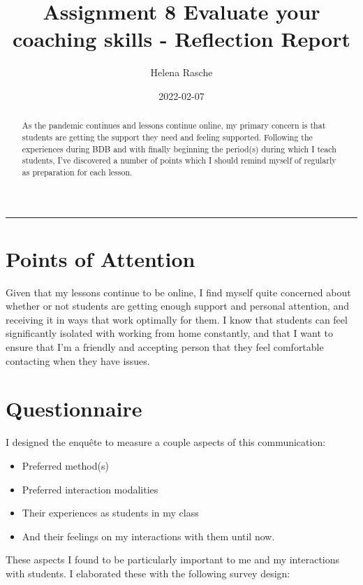 \documentclass[paper=a4,justified,a4paper]{tufte-handout}
\title{Assignment 8 Evaluate your coaching skills - Reflection Report}
\author{Helena Rasche}
\date{2022-02-07}
\providecommand{\tightlist}{%
  \setlength{\itemsep}{0pt}\setlength{\parskip}{0pt}}
\begin{document}
\maketitle
\begin{abstract}
As the pandemic continues and lessons continue online, my primary
concern is that students are getting the support they need and feeling
supported. Following the experiences during BDB and with finally
beginning the period(s) during which I teach students, I've discovered a
number of points which I should remind myself of regularly as
preparation for each lesson.
\end{abstract}
\noindent\rule{5in}{0.4pt}


\hypertarget{points-of-attention}{%
\section{Points of Attention}\label{points-of-attention}}

Given that my lessons continue to be online, I find myself quite
concerned about whether or not students are getting enough support and
personal attention, and receiving it in ways that work optimally for
them. I know that students can feel significantly isolated with working
from home constantly, and that I want to ensure that I'm a friendly and
accepting person that they feel comfortable contacting when they have
issues.

\hypertarget{questionnaire}{%
\section{Questionnaire}\label{questionnaire}}

I designed the enquête to measure a couple aspects of this
communication:

\begin{itemize}
\tightlist
\item
  Preferred method(s)
\item
  Preferred interaction modalities
\item
  Their experiences as students in my class
\item
  And their feelings on my interactions with them until now.
\end{itemize}

These aspects I found to be particularly important to me and my
interactions with students. I elaborated these with the following survey
design:
\end{document}

